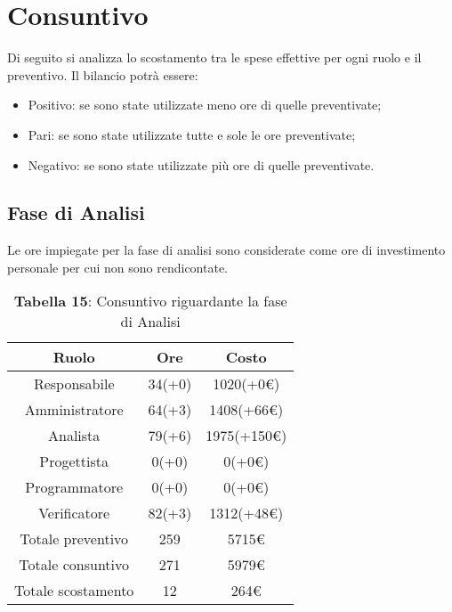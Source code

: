 \section{Consuntivo}
Di seguito si analizza lo scostamento tra le spese effettive per ogni ruolo e il preventivo. Il bilancio potrà essere:
\begin{itemize}
	\item Positivo: se sono state utilizzate meno ore di quelle preventivate;
	\item Pari: se sono state utilizzate tutte e sole le ore preventivate;
	\item Negativo: se sono state utilizzate più ore di quelle preventivate.
\end{itemize}
\subsection{Fase di Analisi}
Le ore impiegate per la fase di analisi sono considerate come ore di investimento personale per cui non sono rendicontate.
\begin{table}[H]
	\centering
	\renewcommand{\arraystretch}{1.5}
	\begin{tabular}{|c|c|c|}
		\hline
		\rowcolor{lighter-grayer}
Ruolo & Ore & Costo \\ \hline
Responsabile & 34(+0) & 1020(+0\euro) \\ \hline
Amministratore & 64(+3) & 1408(+66\euro) \\ \hline
Analista & 79(+6) & 1975(+150\euro) \\ \hline
Progettista & 0(+0) & 0(+0\euro) \\ \hline
Programmatore & 0(+0) & 0(+0\euro) \\ \hline
Verificatore & 82(+3) & 1312(+48\euro) \\ \hline
Totale preventivo & 259 & 5715\euro \\ \hline
Totale consuntivo & 271 & 5979\euro \\ \hline
Totale scostamento & 12 & 264\euro \\ \hline
	\end{tabular}
	\caption*{\textbf{Tabella 15}: Consuntivo riguardante la fase di Analisi\\}
\end{table}

